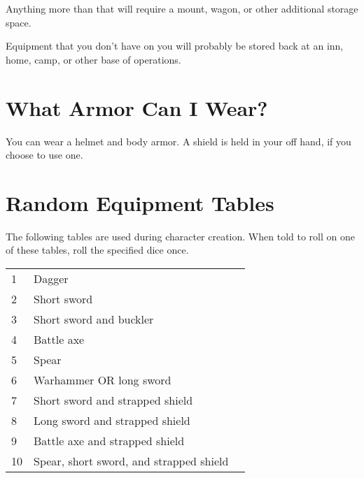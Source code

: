 Anything more than that will require a mount, wagon, or other
additional storage space.

Equipment that you don't have on you will probably be stored
back at an inn, home, camp, or other base of operations.

\section{What Armor Can I Wear?}

You can wear a helmet and body armor. A shield is held in your
off hand, if you choose to use one.

\section{Random Equipment Tables}

The following tables are used during character creation. When told
to roll on one of these tables, roll the specified dice once.

\begin{center}
{
\begin{xtabular}{|l|l|l|}
1 & Dagger \\
2 & Short sword \\
3 & Short sword and buckler \\
4 & Battle axe \\
5 & Spear \\
6 & Warhammer OR long sword \\
7 & Short sword and strapped shield \\
8 & Long sword and strapped shield \\
9 & Battle axe and strapped shield \\
10 & Spear, short sword, and strapped shield \\
\hline
\end{xtabular}
}
\end{center}

